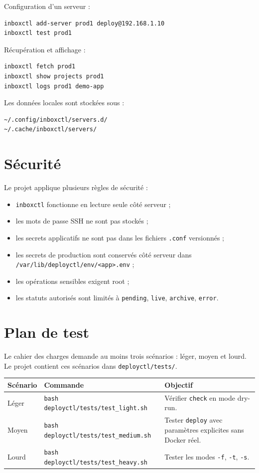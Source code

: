 \documentclass[12pt,a4paper]{article}
\begin{document}
Configuration d'un serveur :

\begin{lstlisting}
inboxctl add-server prod1 deploy@192.168.1.10
inboxctl test prod1
\end{lstlisting}

Récupération et affichage :

\begin{lstlisting}
inboxctl fetch prod1
inboxctl show projects prod1
inboxctl logs prod1 demo-app
\end{lstlisting}

Les données locales sont stockées sous :

\begin{lstlisting}
~/.config/inboxctl/servers.d/
~/.cache/inboxctl/servers/
\end{lstlisting}

\section{Sécurité}

Le projet applique plusieurs règles de sécurité :
\begin{itemize}[leftmargin=*]
  \item \texttt{inboxctl} fonctionne en lecture seule côté serveur ;
  \item les mots de passe SSH ne sont pas stockés ;
  \item les secrets applicatifs ne sont pas dans les fichiers \texttt{.conf} versionnés ;
  \item les secrets de production sont conservés côté serveur dans \texttt{/var/lib/deployctl/env/<app>.env} ;
  \item les opérations sensibles exigent root ;
  \item les statuts autorisés sont limités à \texttt{pending}, \texttt{live}, \texttt{archive}, \texttt{error}.
\end{itemize}

\section{Plan de test}

Le cahier des charges demande au moins trois scénarios : léger, moyen et lourd. Le projet contient ces scénarios dans \texttt{deployctl/tests/}.

\begin{longtable}{p{}p{}p{}}
\toprule
\textbf{Scénario} & \textbf{Commande} & \textbf{Objectif} \\
\midrule
Léger & \texttt{bash deployctl/tests/test\_light.sh} & Vérifier \texttt{check} en mode dry-run. \\
Moyen & \texttt{bash deployctl/tests/test\_medium.sh} & Tester \texttt{deploy} avec paramètres explicites sans Docker réel. \\
Lourd & \texttt{bash deployctl/tests/test\_heavy.sh} & Tester les modes \texttt{-f}, \texttt{-t}, \texttt{-s}. \\
\bottomrule
\end{longtable}
\end{document}
